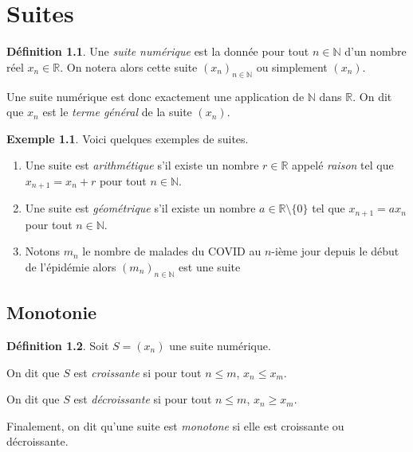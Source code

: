 \documentclass[
]{book}
\providecommand{\tightlist}{%
  \setlength{\itemsep}{0pt}\setlength{\parskip}{0pt}}
\theoremstyle{definition}
\newtheorem{definition}{Définition}[chapter]
\theoremstyle{definition}
\newtheorem{example}{Exemple}[chapter]
\theoremstyle{definition}
\theoremstyle{definition}
\theoremstyle{remark}
\begin{document}
\hypertarget{suites}{%
\chapter{Suites}\label{suites}}

\begin{definition}
Une \emph{suite numérique} est la donnée pour tout \(n\in\mathbb{N}\) d'un nombre réel \(x_n\in\mathbb{R}\). On notera alors cette suite \((x_n)_{n\in\mathbb{N}}\) ou simplement \((x_n)\).
\end{definition}

Une suite numérique est donc exactement une application de \(\mathbb{N}\) dans \(\mathbb{R}\). On dit que \(x_n\) est le \emph{terme général} de la suite \((x_n)\).

\begin{example}

Voici quelques exemples de suites.

\begin{enumerate}
\def\labelenumi{\arabic{enumi}.}
\tightlist
\item
  Une suite est \emph{arithmétique} s'il existe un nombre \(r\in\mathbb{R}\) appelé \emph{raison} tel que \(x_{n+1}=x_n+r\) pour tout \(n\in\mathbb{N}\).
\item
  Une suite est \emph{géométrique} s'il existe un nombre \(a\in\mathbb{R}\setminus\{0\}\) tel que \(x_{n+1}=ax_n\) pour tout \(n\in\mathbb{N}\).
\item
  Notons \(m_n\) le nombre de malades du COVID au \(n\)-ième jour depuis le début de l'épidémie alors \((m_n)_{n\in\mathbb{N}}\) est une suite
\end{enumerate}

\end{example}

\hypertarget{monotonie}{%
\section{Monotonie}\label{monotonie}}

\begin{definition}
Soit \(S=(x_n)\) une suite numérique.

On dit que \(S\) est \emph{croissante} si pour tout \(n\leq m\), \(x_n\leq x_m\).

On dit que \(S\) est \emph{décroissante} si pour tout \(n\leq m\), \(x_n\geq x_m\).

Finalement, on dit qu'une suite est \emph{monotone} si elle est croissante ou décroissante.
\end{definition}
\end{document}
